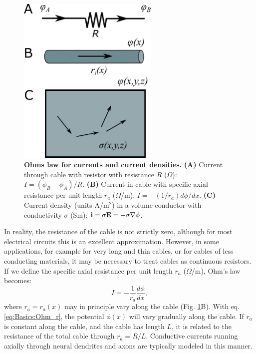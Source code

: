 \begin{figure}[!ht]
\begin{center}
\includegraphics[width=0.6\textwidth]{Figures/Basics/Currents.png}
\end{center}
\caption{{\bf Ohms law for currents and current densities.} {\bf (A)} Current through cable with resistor with resistance $R$ ($\Omega$): $I = (\phi_B-\phi_A)/R$. {\bf (B)} Current in cable with specific axial resistance per unit length $r_a$ ($\Omega$/m).  $I=- (1/r_a) d\phi/dx$. {\bf (C)} Current density (units A/m$^2$) in a volume conductor with conductivity $\sigma$ (Sm): ${\bf i} = \sigma {\bf E} = - \sigma \nabla \phi$.}
\label{fig:Basics:Currents}
\end{figure}

In reality, the resistance of the cable is not strictly zero, although for most electrical circuits this is an excellent approximation. However, in some applications, for example for very long and thin cables, or for cables of less conducting materials, it may be necessary to treat cables as continuous resistors. If we define the specific axial resistance per unit length $r_{a}$ ($\Omega$/m), Ohm's law becomes: 
\begin{equation}
I = - \frac{1}{r_a}\frac{d\phi}{dx}, 
\label{eq:Basics:Ohm_r}
\end{equation}
where $r_a=r_a(x)$ may in principle vary along the cable (Fig. \ref{fig:Basics:Currents}B). With eq. \ref{eq:Basics:Ohm_r}, the potential $\phi(x)$ will vary gradually along the cable. If $r_a$ is constant along the cable, and the cable has length $L$, it is related to the resistance of the total cable through $r_a=R/L$. Conductive currents running axially through neural dendrites and axons are typically modeled in this manner. 

